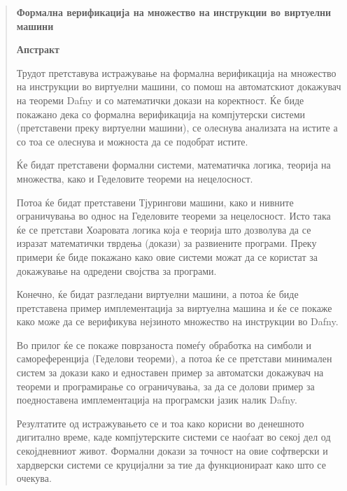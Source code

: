 \begin{quote}
\textbf{Формална верификација на множество на инструкции во виртуелни машини}

\vspace{0.14in}

\textbf{Апстракт}

\vspace{0.14in}

\hspace*{10mm} Трудот претставува истражување на формална верификација на множество на инструкции во виртуелни машини, со помош на автоматскиот докажувач на теореми Dafny и со математички докази на коректност. Ќе биде покажано дека со формална верификација на компјутерски системи (претставени преку виртуелни машини), се олеснува анализата на истите а со тоа се олеснува и можноста да се подобрат истите.

\hspace*{10mm} Ќе бидат претставени формални системи, математичка логика, теорија на множества, како и Геделовите теореми на нецелосност.

\hspace*{10mm} Потоа ќе бидат претставени Тјурингови машини, како и нивните ограничувања во однос на Геделовите теореми за нецелосност. Исто така ќе се претстави Хоаровата логика која е теорија што дозволува да се изразат математички тврдења (докази) за развиените програми. Преку примери ќе биде покажано како овие системи можат да се користат за докажување на одредени својства за програми.

\hspace*{10mm} Конечно, ќе бидат разгледани виртуелни машини, а потоа ќе биде претставена пример имплементација за виртуелна машина и ќе се покаже како може да се верификува нејзиното множество на инструкции во Dafny.

\hspace*{10mm} Во прилог ќе се покаже поврзаноста помеѓу обработка на симболи и самореференција (Геделови теореми), а потоа ќе се претстави минимален систем за докази како и едноставен пример за автоматски докажувач на теореми и програмирање со ограничувања, за да се долови пример за поедноставена имплементација на програмски јазик налик Dafny.

\hspace*{10mm} Резултатите од истражувањето се и тоа како корисни во денешното дигитално време, каде компјутерските системи се наоѓаат во секој дел од секојдневниот живот. Формални докази за точност на овие софтверски и хардверски системи се круцијални за тие да функционираат како што се очекува.


\end{quote}
